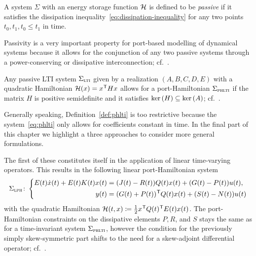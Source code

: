 \begin{definition}\label{def:passivity}
    A system $\Sigma$ with an energy storage function $\mathcal{H}$ is defined to be \emph{passive} if it satisfies the dissipation inequality~\eqref{eq:dissipation-inequality} for any two points $t_0, t_1, t_0 \leq t_1$ in time.
\end{definition}

\begin{remark}
    Passivity is a very important property for port-based modelling of dynamical systems because it allows for the conjunction of any two passive systems through a power-conserving or dissipative interconnection; cf.~\cite{Mehrmann2022, Morandin2022}.
\end{remark}

\begin{remark}
    Any passive \ac{LTI} system $\Sigma_{\textnormal{\scshape lti}}$ given by a realization $(A, B, C, D, E)$ with a quadratic Hamiltonian $\mathcal{H}(x) = x^{\mkern1mu \mathsf{T}} H x$ allows for a port-Hamiltonian $\Sigma_{\textnormal{\scshape phlti}}$ if the matrix $H$ is positive semidefinite and it satisfies $\mathop{}\!\mathrm{ker}\left(H\right) \subseteq \mathop{}\!\mathrm{ker}\left(A\right)$; cf.~\cite[Theorem~7.1]{VanDerSchaft2014}.
\end{remark}

Generally speaking, Definition~\ref{def:phlti} is too restrictive because the system~\eqref{eq:phlti} only allows for coefficients constant in time.
In the final part of this chapter we highlight a three approaches to consider more general formulations.

\begin{remark}
    The first of these constitutes itself in the application of linear time-varying operators.
    This results in the following linear port-Hamiltonian system
    \begin{equation}\label{eq:lph}
        \Sigma_{\textnormal{\scshape lph}} \colon \left\lbrace
        \begin{aligned}
            E(t) \dot{x}(t) + E(t) K(t) x(t) &= (J(t) - R(t)) Q(t) x(t) + (G(t) - P(t)) u(t), \\
            y(t) &= (G(t) + P(t))^{\mkern1mu \mathsf{T}} Q(t) x(t) + (S(t) - N(t)) u(t)
        \end{aligned}
        \right.
    \end{equation}
    with the quadratic Hamiltonian $\mathcal{H}(t, x) \coloneqq \frac{1}{2} x^{\mkern1mu \mathsf{T}} Q(t)^{\mkern1mu \mathsf{T}} E(t) x(t)$.
    The port-Hamiltonian constraints on the dissipative elements $P, R$, and $S$ stays the same as for a time-invariant system $\Sigma_{\textnormal{\scshape phlti}}$, however the condition for the previously simply skew-symmetric part shifts to the need for a skew-adjoint differential operator; cf.~\cite[Definition~4.8]{Mehrmann2022}.
\end{remark}

